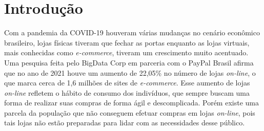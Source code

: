 \newpage
\section{Introdução}
\label{sec:introducao}
 
{Com a pandemia da COVID-19 houveram várias mudanças no cenário econômico brasileiro, lojas físicas tiveram que fechar as portas enquanto as lojas virtuais, mais conhecidas como \textit{\textit{e-commerce}}, tiveram um crescimento muito acentuado. Uma pesquisa feita pelo BigData Corp em parceria com o PayPal Brasil \cite{ECOMMERCE} afirma que no ano de 2021 houve um aumento de 22,05\% no número de lojas \textit{on-line}, o que marca cerca de 1,6 milhões de sites de \textit{e-commerce}. Esse aumento de lojas \textit{on-line} refletem o hábito de consumo dos indivíduos, que sempre buscam uma forma de realizar suas compras de forma ágil e descomplicada. Porém existe uma parcela da população que não conseguem efetuar compras em lojas \textit{on-line}, pois tais lojas não estão preparadas para lidar com as necessidades desse público.


}
